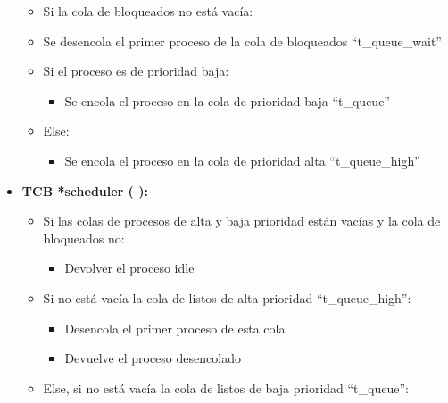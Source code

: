 \documentclass[10pt, spanish, pdftex]{template/UC3M_document}
\begin{document}
\begin{itemize}
    \begin{itemize}
     \setlength{\itemsep}{-1.5mm}
        \item Si la cola de bloqueados no está vacía:
        \item Se desencola el primer proceso de la cola de bloqueados “t\_queue\_wait”
        \item Si el proceso es de prioridad baja:
        \vspace{-2mm}
    \begin{itemize}
     \setlength{\itemsep}{-1.5mm}
            \item Se encola el proceso en la cola de prioridad baja “t\_queue”
        \end{itemize}
        \item Else:
        \vspace{-2mm}
    \begin{itemize}
     \setlength{\itemsep}{-1.5mm}
            \item Se encola el proceso en la cola de prioridad alta “t\_queue\_high”
        \end{itemize}
    \end{itemize}
    \item \textbf{TCB *scheduler ( ):}
    \vspace{-2mm}
    \begin{itemize}
     \setlength{\itemsep}{-1.5mm}
        \item Si las colas de procesos de alta y baja prioridad están vacías y la cola de bloqueados no:
        \vspace{-2mm}
    \begin{itemize}
     \setlength{\itemsep}{-1.5mm}
            \item Devolver el proceso idle
        \end{itemize}
        \item Si no está vacía la cola de listos de alta prioridad “t\_queue\_high”:
        \vspace{-2mm}
    \begin{itemize}
     \setlength{\itemsep}{-1.5mm}
            \item Desencola el primer proceso de esta cola
            \item Devuelve el proceso desencolado
        \end{itemize}
        \item Else, si no está vacía la cola de listos de baja prioridad “t\_queue”:
        \vspace{-2mm}
    \begin{itemize}

\end{itemize}
\end{itemize}
\end{itemize}
\end{document}
